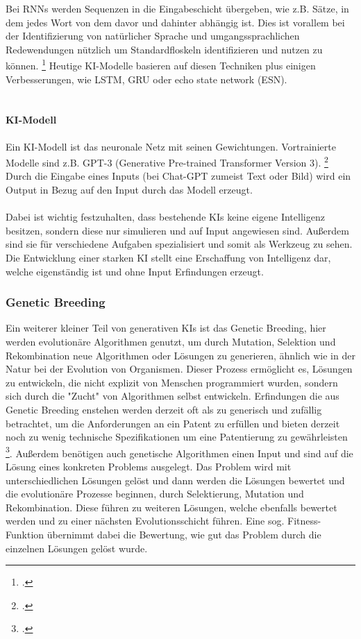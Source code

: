 Bei RNNs werden Sequenzen in die Eingabeschicht übergeben, 
wie z.B. Sätze, 
in dem jedes Wort von dem davor und dahinter abhängig ist. 
Dies ist vorallem bei der Identifizierung von natürlicher Sprache 
und umgangssprachlichen Redewendungen nützlich um  
Standardfloskeln identifizieren und nutzen zu können.
\footcite{WasSindRekurrente2023}
Heutige KI-Modelle basieren auf diesen Techniken plus einigen Verbesserungen,
wie \gls{LSTM}, \gls{GRU} 
oder echo state network (ESN).
\\
\\
\paragraph{KI-Modell}
Ein KI-Modell ist das neuronale Netz mit seinen Gewichtungen. 
Vortrainierte Modelle sind z.B. GPT-3 (Generative Pre-trained Transformer Version 3).
\footcite{KuenstlicheIntelligenzKI}
Durch die Eingabe eines Inputs (bei Chat-GPT zumeist Text oder Bild) 
wird ein Output in Bezug auf den Input durch das Modell erzeugt.
\\
\\
Dabei ist wichtig festzuhalten, dass bestehende KIs keine 
eigene Intelligenz besitzen, sondern diese nur simulieren 
und auf Input angewiesen sind. Außerdem sind sie für 
verschiedene Aufgaben spezialisiert und somit als Werkzeug zu sehen. 
Die Entwicklung einer starken KI stellt eine Erschaffung von Intelligenz dar,
welche eigenständig ist und ohne Input Erfindungen erzeugt.

\subsubsection{Genetic Breeding}
Ein weiterer kleiner Teil von generativen KIs ist das Genetic Breeding, 
hier werden evolutionäre Algorithmen genutzt, 
um durch Mutation, Selektion und Rekombination 
neue Algorithmen oder Lösungen zu generieren, 
ähnlich wie in der Natur bei der Evolution von Organismen.
Dieser Prozess ermöglicht es, Lösungen zu entwickeln, 
die nicht explizit von Menschen programmiert wurden, 
sondern sich durch die "Zucht" von Algorithmen 
selbst entwickeln.
Erfindungen die aus Genetic Breeding enstehen werden derzeit
oft als zu generisch und zufällig betrachtet, 
um die Anforderungen an ein Patent zu erfüllen und bieten
derzeit noch zu wenig technische Spezifikationen 
um eine Patentierung zu gewährleisten 
\footcite{hartmannKuenstlicheIntelligenzIm2020}.
Außerdem benötigen auch genetische Algorithmen einen Input
und sind auf die Lösung eines konkreten Problems
ausgelegt. Das Problem wird mit unterschiedlichen
Lösungen gelöst und dann werden die Lösungen bewertet und
die evolutionäre Prozesse beginnen, durch Selektierung, 
Mutation und Rekombination. Diese führen zu weiteren Lösungen,
welche ebenfalls bewertet werden und zu einer nächsten Evolutionsschicht führen.
Eine sog. Fitness-Funktion übernimmt dabei die Bewertung, wie gut das 
Problem durch die einzelnen Lösungen gelöst wurde.


